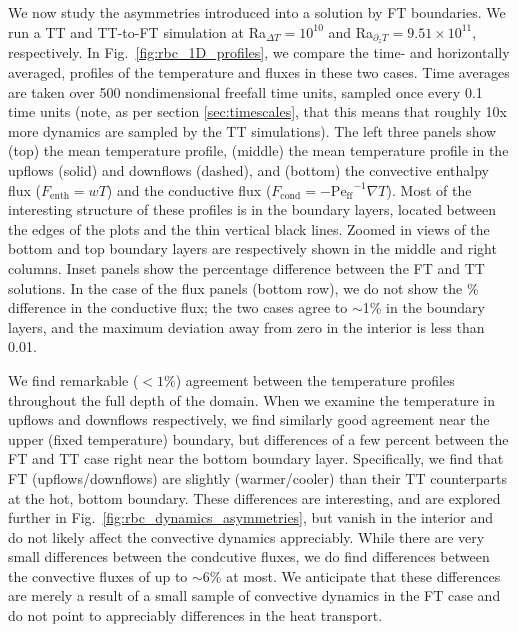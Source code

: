 \documentclass[aps, pre, onecolumn, nofootinbib, notitlepage, groupedaddress, amsfonts, amssymb, amsmath, longbibliography, superscriptaddress]{revtex4-1}
\newcommand{\grad}{\ensuremath{\nabla}}
\newcommand{\Peff}{\ensuremath{\text{Pe}_{\text{ff}}}}
\begin{document}
We now study the asymmetries introduced into a solution by FT boundaries.
We run a TT and TT-to-FT simulation at Ra$_{\Delta T} = 10^{10}$ and Ra$_{\partial_z T} = 9.51 \times 10^{11}$, respectively.
In Fig.~\ref{fig:rbc_1D_profiles}, we compare the time- and horizontally averaged, profiles of the temperature and fluxes in these two cases.
Time averages are taken over 500 nondimensional freefall time units, sampled once every 0.1 time units (note, as per section \ref{sec:timescales}, that this means that roughly 10x more dynamics are sampled by the TT simulations).
The left three panels show (top) the mean temperature profile, (middle) the mean temperature profile in the upflows (solid) and downflows (dashed), and (bottom) the convective enthalpy flux ($F_{\text{enth}} = wT$) and the conductive flux ($F_{\text{cond}} = -\Peff^{-1}\grad T$).
Most of the interesting structure of these profiles is in the boundary layers, located between the edges of the plots and the thin vertical black lines.
Zoomed in views of the bottom and top boundary layers are respectively shown in the middle and right columns.
Inset panels show the percentage difference between the FT and TT solutions.
In the case of the flux panels (bottom row), we do not show the \% difference in the conductive flux; the two cases agree to $\sim$1\% in the boundary layers, and the maximum deviation away from zero in the interior is less than 0.01. 

We find remarkable ($< 1\%$) agreement between the temperature profiles throughout the full depth of the domain.
When we examine the temperature in upflows and downflows respectively, we find similarly good agreement near the upper (fixed temperature) boundary, but differences of a few percent between the FT and TT case right near the bottom boundary layer.
Specifically, we find that FT (upflows/downflows) are slightly (warmer/cooler) than their TT counterparts at the hot, bottom boundary.
These differences are interesting, and are explored further in Fig.~\ref{fig:rbc_dynamics_asymmetries}, but vanish in the interior and do not likely affect the convective dynamics appreciably.
While there are very small differences between the condcutive fluxes, we do find differences between the convective fluxes of up to $\sim 6\%$ at most.
We anticipate that these differences are merely a result of a small sample of convective dynamics in the FT case and do not point to appreciably differences in the heat transport.
\end{document}
